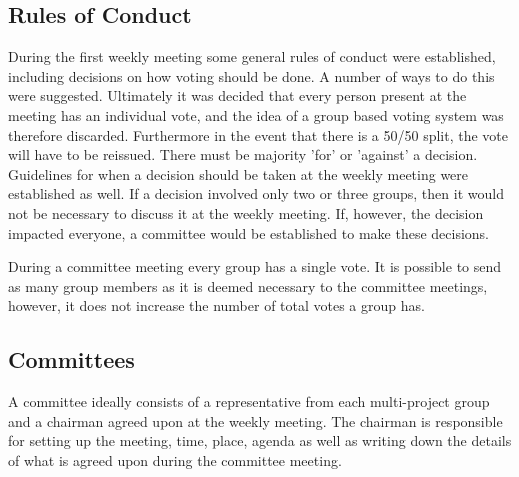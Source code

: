 \subsection{Rules of Conduct}
\label{sub:rulesofconduct}
During the first weekly meeting some general rules of conduct were established, including decisions on how voting should be done. A number of ways to do this were suggested. Ultimately it was decided that every person present at the meeting has an individual vote, and the idea of a group based voting system was therefore discarded. Furthermore in the event that there is a 50/50 split, the vote will have to be reissued. There must be majority 'for' or 'against' a decision. Guidelines for when a decision should be taken at the weekly meeting were established as well. If a decision involved only two or three groups, then it would not be necessary to discuss it at the weekly meeting. If, however, the decision impacted everyone, a committee would be established to make these decisions.


During a committee meeting every group has a single vote. It is possible to send as many group members as it is deemed necessary to the committee meetings, however, it does not increase the number of total votes a group has. %

\subsection{Committees}
\label{sub:committees}
A committee ideally consists of a representative from each multi-project group and a chairman agreed upon at the weekly meeting. The chairman is responsible for setting up the meeting, time, place, agenda as well as writing down the details of what is agreed upon during the committee meeting. %

